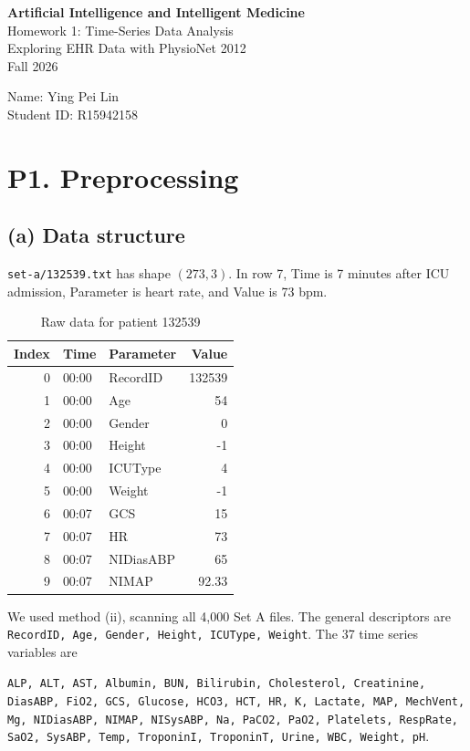 \documentclass[11pt,a4paper]{article}
\begin{document}
\begin{center}
  {\Large\bfseries Artificial Intelligence and Intelligent Medicine}\\[6pt]
  {\large Homework 1: Time-Series Data Analysis}\\[4pt]
  Exploring EHR Data with PhysioNet 2012\\[6pt]
  Fall 2026
\end{center}
\vspace{4pt}
\noindent Name: Ying Pei Lin\\
Student ID: R15942158

\section*{P1. Preprocessing}
\subsection*{(a) Data structure}
\texttt{set-a/132539.txt} has shape $(273,3)$.
In row 7, Time is 7 minutes after ICU admission, Parameter is heart rate, and Value is 73 bpm.

\begin{table}[H]
\centering
\caption{Raw data for patient 132539}\label{tab:raw}
\begin{tabular}{rllr}
\toprule
Index & Time & Parameter & Value\\
\midrule
0 & 00:00 & RecordID & 132539 \\
1 & 00:00 & Age & 54 \\
2 & 00:00 & Gender & 0 \\
3 & 00:00 & Height & -1 \\
4 & 00:00 & ICUType & 4 \\
5 & 00:00 & Weight & -1 \\
6 & 00:07 & GCS & 15 \\
7 & 00:07 & HR & 73 \\
8 & 00:07 & NIDiasABP & 65 \\
9 & 00:07 & NIMAP & 92.33 \\
\bottomrule
\end{tabular}
\end{table}

We used method (ii), scanning all 4,000 Set A files. The general descriptors are
\texttt{RecordID, Age, Gender, Height, ICUType, Weight}.
The 37 time series variables are
{\raggedright\texttt{ALP, ALT, AST, Albumin, BUN, Bilirubin, Cholesterol, Creatinine, DiasABP, FiO2, GCS,
Glucose, HCO3, HCT, HR, K, Lactate, MAP, MechVent, Mg, NIDiasABP, NIMAP, NISysABP, Na,
PaCO2, PaO2, Platelets, RespRate, SaO2, SysABP, Temp, TroponinI, TroponinT, Urine, WBC, Weight, pH}.\par}
\end{document}
